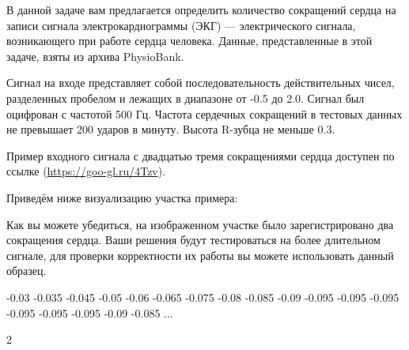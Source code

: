 
В данной задаче вам предлагается определить количество сокращений сердца на записи сигнала 
электрокардиограммы (ЭКГ) — электрического сигнала, возникающего при работе сердца человека. 
Данные, представленные в этой задаче, взяты из архива PhysioBank.

Сигнал на входе представляет собой последовательность действительных чисел, разделенных пробелом и лежащих в диапазоне от -0.5 до 2.0. Сигнал был оцифрован с частотой 500 Гц. Частота сердечных сокращений в тестовых данных не превышает 200 ударов в минуту. Высота R-зубца не меньше 0.3.

Пример входного сигнала с двадцатью тремя сокращениями сердца доступен по ссылке (\url{https://goo-gl.ru/4Tzv}).

Приведём ниже визуализацию участка примера:


Как вы можете убедиться, на изображенном участке было зарегистрировано два сокращения сердца. Ваши 
решения будут тестироваться на более длительном сигнале, для проверки 
корректности их работы вы можете использовать данный образец.


\begin{myverbbox}[\small]{\vinput}
    -0.03 -0.035 -0.045 -0.05 -0.06 -0.065 -0.075 -0.08 -0.085 
    -0.09 -0.095 -0.095 -0.095 -0.095 -0.095 -0.095 -0.09 -0.085
    ...
\end{myverbbox}
\begin{myverbbox}[\small]{\voutput}
   2
\end{myverbbox}


